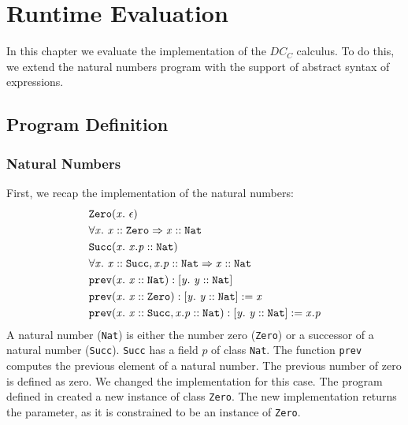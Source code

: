 \chapter{Runtime Evaluation} %
In this chapter we evaluate the implementation of the $DC_C$ calculus.
To do this, we extend the natural numbers program with the support of
abstract syntax of expressions.

\section{Program Definition}
\subsection{Natural Numbers}
First, we recap the implementation of the natural numbers:
\begin{align*}
&\mathit{\texttt{Zero}}(\mathit{x}.\ \mathit{\epsilon})\\
& \forall \mathit{x}.\ \mathit{\mathit{x} :: \mathit{\texttt{Zero}}} \Rightarrow \mathit{\mathit{x} :: \mathit{\texttt{Nat}}}\\
&\mathit{\texttt{Succ}}(\mathit{x}.\ \mathit{\mathit{x.p} :: \mathit{\texttt{Nat}}})\\
& \forall \mathit{x}.\ \mathit{\mathit{x} :: \mathit{\texttt{Succ}}, \mathit{x.p} :: \mathit{\texttt{Nat}}} \Rightarrow \mathit{\mathit{x} :: \mathit{\texttt{Nat}}}\\
&\mathit{\texttt{prev}}(\mathit{x}.\ \mathit{\mathit{x} :: \mathit{\texttt{Nat}}}): \mathit{[y.\ \mathit{\mathit{y} :: \mathit{\texttt{Nat}}}]}\\
&\mathit{\texttt{prev}}(\mathit{x}.\ \mathit{\mathit{x} :: \mathit{\texttt{Zero}}}): \mathit{[y.\ \mathit{\mathit{y} :: \mathit{\texttt{Nat}}}]} := \mathit{x}\\
&\mathit{\texttt{prev}}(\mathit{x}.\ \mathit{\mathit{x} :: \mathit{\texttt{Succ}}, \mathit{x.p} :: \mathit{\texttt{Nat}}}): \mathit{[y.\ \mathit{\mathit{y} :: \mathit{\texttt{Nat}}}]} := \mathit{x.p}
\end{align*}
%
A natural number (\texttt{Nat}) is either the number zero (\texttt{Zero})
or a successor of a natural number (\texttt{Succ}).
\texttt{Succ} has a field $p$ of class \texttt{Nat}.
The function \texttt{prev} computes the previous element of a natural number.
The previous number of zero is defined as zero.
We changed the implementation for this case.
The program defined in  created a new
instance of class \texttt{Zero}.
The new implementation returns the parameter,
as it is constrained to be an instance of \texttt{Zero}.

